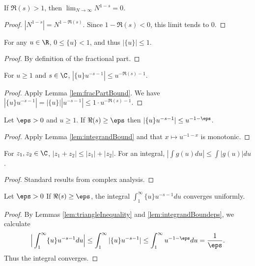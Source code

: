 \begin{lemma}\label{lem:limitTerm1}
\leanok
If $\Re(s)>1$, then $\lim_{N\to\infty} N^{1-s} = 0$.
\end{lemma}
\begin{proof}
\leanok
$|N^{1-s}| = N^{1-\Re(s)}$. Since $1-\Re(s) < 0$, this limit tends to 0.
\end{proof}

\begin{lemma}\label{lem:fracPartBound}
\leanok
For any $u\in\R$, $0 \le \{u\} < 1$, and thus $|\{u\}| \le 1$.
\end{lemma}
\begin{proof}
\leanok
By definition of the fractional part.
\end{proof}


\begin{lemma}\label{lem:integrandBound}
\leanok
For $u\ge 1$ and $s\in\C$, $|\{u\} u^{-s-1}| \le u^{-\Re(s)-1}$.
\end{lemma}
\begin{proof}
\leanok
{}
Apply Lemma \ref{lem:fracPartBound}. We have $|\{u\} u^{-s-1}| = |\{u\}| |u^{-s-1}| \le 1 \cdot u^{-\Re(s)-1}$.
\end{proof}

\begin{lemma}\label{lem:integrandBoundeps}
\leanok
Let $\eps>0$ and $u\ge 1$. If $\Re(s)\ge \eps$ then $|\{u\} u^{-s-1}| \le u^{-1-\eps}$.
\end{lemma}
\begin{proof}
\leanok
{}
Apply Lemma \ref{lem:integrandBound} and that $x\mapsto u^{-1-x}$ is monotonic.
\end{proof}

\begin{lemma}\label{lem:triangleInequality}
\leanok
For $z_1, z_2 \in \C$, $|z_1+z_2| \le |z_1|+|z_2|$. For an integral, $|\int g(u)du| \le \int |g(u)|du$.
\end{lemma}
\begin{proof}
\leanok
Standard results from complex analysis.
\end{proof}

\begin{lemma}\label{lem:integralConvergence}
\leanok
Let $\eps>0$ If $\Re(s)\ge \eps$, the integral $\int_1^\infty \{u\} u^{-s-1} du$ converges uniformly.
\end{lemma}
\begin{proof}
 \leanok
By Lemmas \ref{lem:triangleInequality} and \ref{lem:integrandBoundeps}, we calculate
\[\Big|\int_1^\infty \{u\} u^{-s-1} du \Big| \le \int_1^\infty |\{u\} u^{-s-1}| \le \int_1^\infty u^{-1-\eps} du = \frac{1}{\eps}. \]
Thus the integral converges.
\end{proof}

